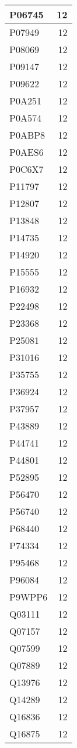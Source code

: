 \documentclass[
]{book}
\theoremstyle{definition}
\theoremstyle{definition}
\theoremstyle{definition}
\theoremstyle{definition}
\theoremstyle{remark}
\begin{document}
\begin{table}
\begin{tabular}{l|r}
\hline
P06745 & 12\\
\hline
P07949 & 12\\
\hline
P08069 & 12\\
\hline
P09147 & 12\\
\hline
P09622 & 12\\
\hline
P0A251 & 12\\
\hline
P0A574 & 12\\
\hline
P0ABP8 & 12\\
\hline
P0AES6 & 12\\
\hline
P0C6X7 & 12\\
\hline
P11797 & 12\\
\hline
P12807 & 12\\
\hline
P13848 & 12\\
\hline
P14735 & 12\\
\hline
P14920 & 12\\
\hline
P15555 & 12\\
\hline
P16932 & 12\\
\hline
P22498 & 12\\
\hline
P23368 & 12\\
\hline
P25081 & 12\\
\hline
P31016 & 12\\
\hline
P35755 & 12\\
\hline
P36924 & 12\\
\hline
P37957 & 12\\
\hline
P43889 & 12\\
\hline
P44741 & 12\\
\hline
P44801 & 12\\
\hline
P52895 & 12\\
\hline
P56470 & 12\\
\hline
P56740 & 12\\
\hline
P68440 & 12\\
\hline
P74334 & 12\\
\hline
P95468 & 12\\
\hline
P96084 & 12\\
\hline
P9WPP6 & 12\\
\hline
Q03111 & 12\\
\hline
Q07157 & 12\\
\hline
Q07599 & 12\\
\hline
Q07889 & 12\\
\hline
Q13976 & 12\\
\hline
Q14289 & 12\\
\hline
Q16836 & 12\\
\hline
Q16875 & 12\\

\end{tabular}
\end{table}
\end{document}

